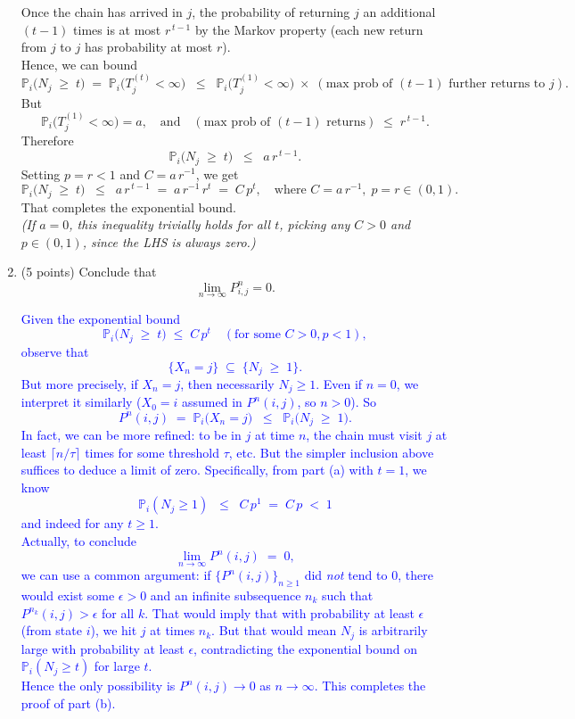 \documentclass{article}
\begin{document}
\begin{enumerate}[label=(\alph*)]
{Once the chain has arrived in $j$, the probability of returning $j$ an additional $(t-1)$ times is at most $r^{\,t-1}$ by the Markov property (each new return from $j$ to $j$ has probability at most $r$).  \\
Hence, we can bound
\[
\mathbb{P}_i\bigl(N_j \;\ge\; t\bigr)
\;=\;
\mathbb{P}_i\bigl(T_j^{(t)} < \infty\bigr)
\;\;\le\;\;
\mathbb{P}_i\bigl(T_j^{(1)} < \infty\bigr)
\;\times\;
(\text{max prob of $(t-1)$ further returns to $j$}).
\]
But 
\[
\mathbb{P}_i\bigl(T_j^{(1)} < \infty\bigr) = a,
\quad\text{and}\quad
(\text{max prob of $(t-1)$ returns})
\;\le\;
r^{\,t-1}.
\]
Therefore
\[
\mathbb{P}_i\bigl(N_j \;\ge\; t\bigr)
\;\;\le\;\;
a \, r^{\,t-1}.
\]
Setting $p = r < 1$ and $C = a \, r^{-1}$, we get
\[
\mathbb{P}_i\bigl(N_j \;\ge\; t\bigr)
\;\;\le\;\;
a \, r^{\,t-1}
\;=\;
a\,r^{-1}\,r^t
\;=\;
C\,p^t,
\quad
\text{where } C = a\,r^{-1},\; p = r \in (0,1).
\]
That completes the exponential bound. \\
\emph{(If $a=0$, this inequality trivially holds for all $t$, picking any $C>0$ and $p \in (0,1)$, since the LHS is always zero.)}
}

\item (5 points) Conclude that 
\[
\lim_{n \to \infty} P^n_{i,j} = 0.
\]

\textcolor{blue}{
    Given the exponential bound
\[
\mathbb{P}_i\bigl(N_j \;\ge\; t\bigr) \;\le\; C\,p^t
\quad (\text{for some }C>0, p<1),
\]
observe that
\[
\{X_n = j\}
\;\subseteq\;
\{N_j \;\ge\; 1\}.
\]
But more precisely, if $X_n = j$, then necessarily $N_j \ge 1$. Even if $n=0$, we interpret it similarly ($X_0 = i$ assumed in $P^n(i,j)$, so $n>0$). So
\[
P^n(i,j) 
\;=\;
\mathbb{P}_i\bigl(X_n = j\bigr)
\;\;\le\;\;
\mathbb{P}_i\bigl(N_j \;\ge\; 1\bigr).
\]
In fact, we can be more refined: to be in $j$ at time $n$, the chain must visit $j$ at least $\lceil n/\tau\rceil$ times for some threshold $\tau$, etc. But the simpler inclusion above suffices to deduce a limit of zero. Specifically, from part (a) with $t=1$, we know 
\[
\mathbb{P}_i(N_j \ge 1) 
\;\;\le\;\;
C \, p^1 
\;=\;
C\,p
\;<\; 
1
\]
and indeed for any $t \ge 1$.  \\
Actually, to conclude 
\[
\lim_{n\to\infty} P^n(i,j) 
\;=\; 0,
\]
we can use a common argument: if $\{P^n(i,j)\}_{n\ge1}$ did \emph{not} tend to $0$, there would exist some $\epsilon>0$ and an infinite subsequence $n_k$ such that $P^{n_k}(i,j) > \epsilon$ for all $k$. That would imply that with probability at least $\epsilon$ (from state $i$), we hit $j$ at times $n_k$. But that would mean $N_j$ is arbitrarily large with probability at least $\epsilon$, contradicting the exponential bound on $\mathbb{P}_i(N_j \ge t)$ for large $t$. \\
Hence the only possibility is $P^n(i,j) \to 0$ as $n \to \infty$. This completes the proof of part (b).
}

\end{enumerate}
\end{document}
